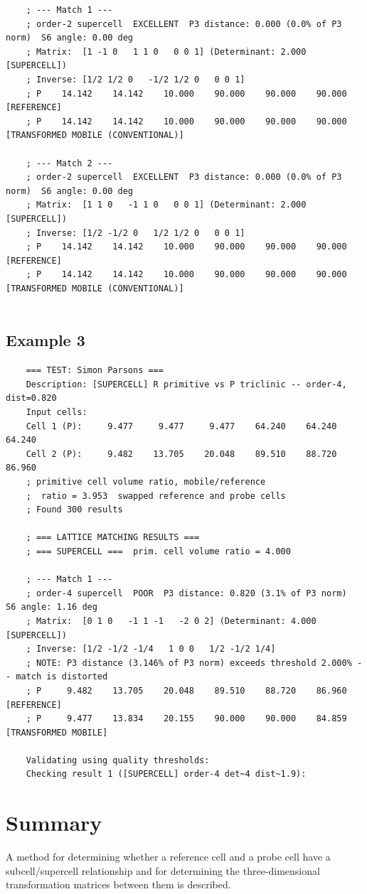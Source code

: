 \documentclass[preprint]{iucr}              %
\numberwithin{equation}{section}
\begin{document}
{\begin{verbatim}
	; --- Match 1 ---
	; order-2 supercell  EXCELLENT  P3 distance: 0.000 (0.0% of P3 norm)  S6 angle: 0.00 deg
	; Matrix:  [1 -1 0   1 1 0   0 0 1] (Determinant: 2.000  [SUPERCELL])
	; Inverse: [1/2 1/2 0   -1/2 1/2 0   0 0 1]
	; P    14.142    14.142    10.000    90.000    90.000    90.000  [REFERENCE]
	; P    14.142    14.142    10.000    90.000    90.000    90.000  [TRANSFORMED MOBILE (CONVENTIONAL)]
	
	; --- Match 2 ---
	; order-2 supercell  EXCELLENT  P3 distance: 0.000 (0.0% of P3 norm)  S6 angle: 0.00 deg
	; Matrix:  [1 1 0   -1 1 0   0 0 1] (Determinant: 2.000  [SUPERCELL])
	; Inverse: [1/2 -1/2 0   1/2 1/2 0   0 0 1]
	; P    14.142    14.142    10.000    90.000    90.000    90.000  [REFERENCE]
	; P    14.142    14.142    10.000    90.000    90.000    90.000  [TRANSFORMED MOBILE (CONVENTIONAL)]
	
\end{verbatim}

\subsection{Example 3}

\begin{verbatim}
	=== TEST: Simon Parsons ===
	Description: [SUPERCELL] R primitive vs P triclinic -- order-4, dist=0.820
	Input cells:
	Cell 1 (P):     9.477     9.477     9.477    64.240    64.240    64.240 
	Cell 2 (P):     9.482    13.705    20.048    89.510    88.720    86.960 
	; primitive cell volume ratio, mobile/reference
	;  ratio = 3.953  swapped reference and probe cells
	; Found 300 results
	
	; === LATTICE MATCHING RESULTS ===
	; === SUPERCELL ===  prim. cell volume ratio = 4.000
	
	; --- Match 1 ---
	; order-4 supercell  POOR  P3 distance: 0.820 (3.1% of P3 norm)  S6 angle: 1.16 deg
	; Matrix:  [0 1 0   -1 1 -1   -2 0 2] (Determinant: 4.000  [SUPERCELL])
	; Inverse: [1/2 -1/2 -1/4   1 0 0   1/2 -1/2 1/4]
	; NOTE: P3 distance (3.146% of P3 norm) exceeds threshold 2.000% -- match is distorted
	; P     9.482    13.705    20.048    89.510    88.720    86.960  [REFERENCE]
	; P     9.477    13.834    20.155    90.000    90.000    84.859  [TRANSFORMED MOBILE]
	
	Validating using quality thresholds:
	Checking result 1 ([SUPERCELL] order-4 det~4 dist~1.9):
\end{verbatim}


	\section{Summary}
A method for determining whether  a reference cell and a probe cell have a subcell/supercell relationship and
for determining the three-dimensional
transformation matrices between them is described.

}
\end{document}

